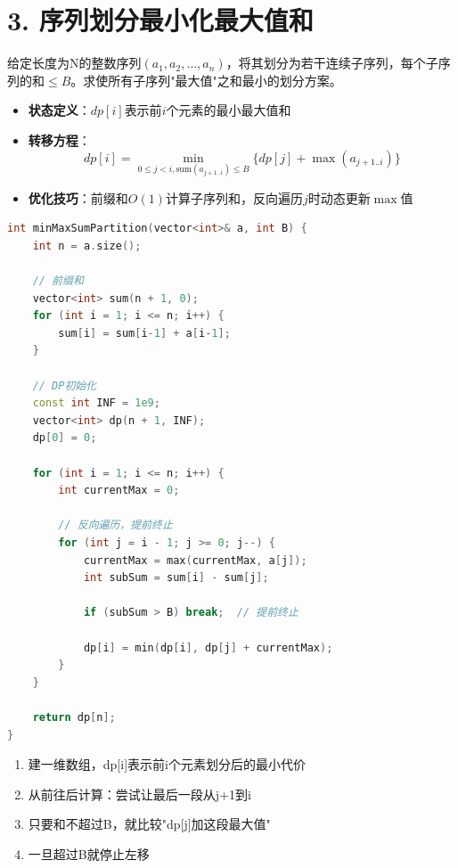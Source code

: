 \section*{3. 序列划分最小化最大值和}

给定长度为N的整数序列$(a_1, a_2, \ldots, a_n)$，将其划分为若干连续子序列，每个子序列的和$\le B$。求使所有子序列"最大值"之和最小的划分方案。



\begin{itemize}
    \item \textbf{状态定义}：$dp[i]$表示前$i$个元素的最小最大值和
    \item \textbf{转移方程}：$$dp[i] = \min_{0 \le j < i, \text{sum}(a_{j+1..i}) \le B} \{dp[j] + \max(a_{j+1..i})\}$$
    \item \textbf{优化技巧}：前缀和$O(1)$计算子序列和，反向遍历$j$时动态更新$\max$值
\end{itemize}

\begin{lstlisting}[language=C++, style=cppstyle]
int minMaxSumPartition(vector<int>& a, int B) {
    int n = a.size();

    // 前缀和
    vector<int> sum(n + 1, 0);
    for (int i = 1; i <= n; i++) {
        sum[i] = sum[i-1] + a[i-1];
    }

    // DP初始化
    const int INF = 1e9;
    vector<int> dp(n + 1, INF);
    dp[0] = 0;

    for (int i = 1; i <= n; i++) {
        int currentMax = 0;

        // 反向遍历，提前终止
        for (int j = i - 1; j >= 0; j--) {
            currentMax = max(currentMax, a[j]);
            int subSum = sum[i] - sum[j];

            if (subSum > B) break;  // 提前终止

            dp[i] = min(dp[i], dp[j] + currentMax);
        }
    }

    return dp[n];
}
\end{lstlisting}


\begin{enumerate}
    \item 建一维数组，dp[i]表示前i个元素划分后的最小代价
    \item 从前往后计算：尝试让最后一段从j+1到i
    \item 只要和不超过B，就比较"dp[j]加这段最大值"
    \item 一旦超过B就停止左移
\end{enumerate}

